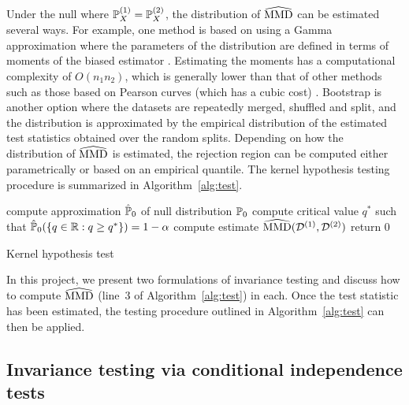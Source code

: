 Under the null where $\P_X^{(1)}=\P_X^{(2)}$, the distribution of $\hatMMD$ can be estimated several ways. For example, one method is based on using a Gamma approximation where the parameters of the distribution are defined in terms of moments of the biased estimator \parencite{Gretton:2009}. Estimating the moments has a computational complexity of $O(n_1n_2)$, which is generally lower than that of other methods such as those based on Pearson curves (which has a cubic cost) \parencite{Gretton:2009}. Bootstrap is another option where the datasets are repeatedly merged, shuffled and split, and the distribution is approximated by the empirical distribution of the estimated test statistics obtained over the random splits. Depending on how the distribution of $\hatMMD$ is estimated, the rejection region can be computed either parametrically or based on an empirical quantile. The kernel hypothesis testing procedure is summarized in Algorithm~\ref{alg:test}.
\\

\begin{algorithm}[H]
\SetAlgoLined
{}
\BlankLine
compute approximation $\hat{\P}_0$ of null distribution $\P_0$\;
compute critical value $q^*$ such that $\hat{\P}_0(\{q\in\bbR:q\geq q^*\})=1-\alpha$\;
compute estimate $\hatMMD(\calD^{(1)},\calD^{(2)})$\;
return 0\;
\caption{Kernel hypothesis test}
\label{alg:test}
\end{algorithm}
\vspace{1em}

In this project, we present two formulations of invariance testing and discuss how to compute $\hatMMD$ (line~3 of Algorithm~\ref{alg:test}) in each. Once the test statistic has been estimated, the testing procedure outlined in Algorithm~\ref{alg:test} can then be applied.


\subsection{Invariance testing via conditional independence tests} \label{sec:condind}

